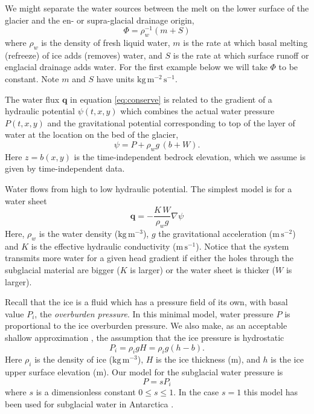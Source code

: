 \documentclass[12pt,final]{amsart}%
\newcommand\bq{\mathbf{q}}
\newcommand{\grad}{\nabla}
\begin{document}
We might separate the water sources between the melt on the lower surface of the glacier and the en- or supra-glacial drainage origin,
  $$\Phi = \rho_w^{-1} \left(m + S\right)$$
where $\rho_w$ is the density of fresh liquid water, $m$ is the rate at which basal melting (refreeze) of ice adds (removes) water, and $S$ is the rate at which surface runoff or englacial drainage adds water.  For the first example below we will take $\Phi$ to be constant.  Note $m$ and $S$ have units $\text{kg}\,\text{m}^{-2}\,\text{s}^{-1}$.

The water flux $\bq$ in equation \eqref{eq:conserve} is related to the gradient of a hydraulic potential $\psi(t,x,y)$ which combines the actual water pressure $P(t,x,y)$ and the gravitational potential corresponding to top of the layer of water at the location on the bed of the glacier,
\begin{equation} \label{eq:potential}
\psi = P + \rho_w g\, (b+W).
\end{equation}
Here $z=b(x,y)$ is the time-independent bedrock elevation, which we assume is given by time-independent data.

Water flows from high to low hydraulic potential.  The simplest model is for a water sheet \citep{Clarke05}
\begin{equation}  \label{eq:flux}
\bq = - \frac{K \, W}{\rho_w g} \grad \psi
\end{equation}
Here, $\rho_w$ is the water density ($\text{kg}\,\text{m}^{-3}$), $g$ the gravitational acceleration ($\text{m}\,\text{s}^{-2}$) and $K$ is the effective hydraulic conductivity ($\text{m}\,\text{s}^{-1}$).  Notice that the system transmits more water for a given head gradient if either the holes through the subglacial material are bigger ($K$ is larger) or the water sheet is thicker ($W$ is larger).

Recall that the ice is a fluid which has a pressure field of its own, with basal value $P_i$, the \emph{overburden pressure}.  In this minimal model, water pressure $P$ is proportional to the ice overburden pressure.  We also make, as an acceptable shallow approximation \citep{GreveBlatter2009}, the assumption that the ice pressure is hydrostatic
\begin{equation} \label{eq:hydrostatic}
  P_i = \rho_i g H = \rho_i g (h-b).
\end{equation}
Here $\rho_i$ is the density of ice ($\text{kg}\,\text{m}^{-3}$), $H$ is the ice thickness (m), and $h$ is the ice upper surface elevation (m).  Our model for the subglacial water pressure is
\begin{equation} \label{eq:pisoverburden}
  P = s P_i
\end{equation}
where $s$ is a dimensionless constant $0\le s \le 1$.  In the case $s=1$ this model has been used for subglacial water in Antarctica \citep{LeBrocqetal2009}.
\end{document}
